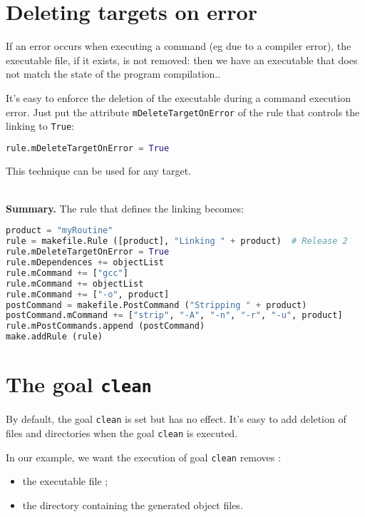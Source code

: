 \documentclass[a4paper,11pt]{extarticle}
\begin{document}
\section{Deleting targets on error}

If an error occurs when executing a command (eg due to a compiler error), the executable file, if it exists, is not removed: then we have an executable that does not match the state of the program compilation..

It's easy to enforce the deletion of the executable during a command execution error. Just put the attribute \texttt{mDeleteTargetOnError} of the rule that controls the linking to \texttt{True}:

\begin{lstlisting}[language=py]
rule.mDeleteTargetOnError = True
\end{lstlisting}
This technique can be used for any target.

~\\{\bf Summary.} The rule that defines the linking becomes:
\begin{lstlisting}[language=py]
product = "myRoutine"
rule = makefile.Rule ([product], "Linking " + product)  # Release 2
rule.mDeleteTargetOnError = True
rule.mDependences += objectList
rule.mCommand += ["gcc"]
rule.mCommand += objectList
rule.mCommand += ["-o", product]
postCommand = makefile.PostCommand ("Stripping " + product)
postCommand.mCommand += ["strip", "-A", "-n", "-r", "-u", product]
rule.mPostCommands.append (postCommand)
make.addRule (rule)
\end{lstlisting}







\section{The goal \texttt{clean}}

By default, the goal \texttt{clean} is set but has no effect. It's easy to add deletion of files and directories when the goal \texttt{clean} is executed.

In our example, we want the execution of goal \texttt{clean} removes :
\begin{itemize}
  \item the executable file ;
  \item the directory containing the generated object files.
\end{itemize}
\end{document}
